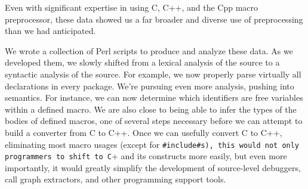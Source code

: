 Even with significant expertise in using C, C++, and the Cpp macro
preprocessor, these data showed us a far broader and diverse use of
preprocessing than we had anticipated.  

We wrote a collection of Perl scripts to produce and analyze these
data.  As we developed them, we slowly shifted from a lexical analysis
of the source to a syntactic analysis of the source.  For example, we
now properly parse virtually all declarations in every package.  We're
pursuing even more analysis, pushing into semantics.  For instance, we
can now determine which identifiers are free variables within a
defined macro.  We are also close to being able to infer the types of
the bodies of defined macros, one of several steps necessary before we
can attempt to build a converter from C to C++.  Once we can usefully
convert C to C++, eliminating most macro usages (except for
\verb+#include#s), this would not only programmers to shift to C++ and
its constructs more easily, but even more importantly, it would
greatly simplify the development of source-level debuggers, call graph
extractors, and other programming support tools.

%


\small 


